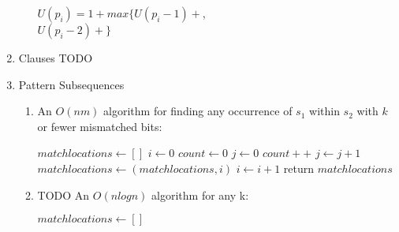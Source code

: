 \documentclass[a4paper]{article}
\begin{document}
\begin{enumerate}
\begin{enumerate}
\begin{algorithmic}
			\State $U(p_i) = 1 + max\{U(p_i-1 ) + $,\\
			\indent\indent\indent\indent\indent\indent$U(p_i-2 ) + $$\}$
		\EndFor
		\end{algorithmic}
	\end{enumerate}
\item Clauses TODO
\item Pattern Subsequences
	\begin{enumerate}
	\item An $O(nm)$ algorithm for finding any occurrence of $s_1$ within $s_2$ with $k$ or fewer mismatched bits:
		\begin{algorithmic}
		\State $matchlocations \gets [ ]$
		\State $i \gets 0$
			\State $count \gets 0$
			\State $j \gets 0$
					\State $count++$
				\EndIf
				\State $j \gets j + 1$
			\EndFor
				\State $matchlocations \gets (matchlocations, i)$
			\EndIf
			\State $i \gets i + 1$
		\EndFor
		\State return $matchlocations$
		\end{algorithmic}
	\item TODO An $O(n log n)$ algorithm for any k:
		\begin{algorithmic}
		\State $matchlocations \gets [ ]$
		

\end{algorithmic}
\end{enumerate}
\end{enumerate}
\end{document}
